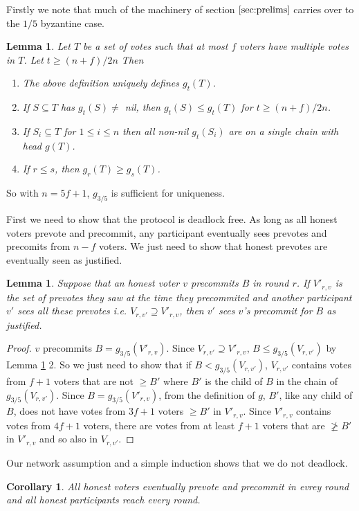 \documentclass{article}
\newtheorem{lemma}[theorem]{Lemma}
\newtheorem{corollary}[theorem]{Corollary}
\begin{document}
Firstly we note that much of the machinery of section $\ref{sec:prelims}$ carries over to the $1/5$ byzantine case.

\begin{lemma} \label{lem:ghost-monotonicity-general}
Let $T$ be a set of votes such that at most $f$ voters have multiple votes in $T$. Let $t \geq (n+f)/2n$ Then
\begin{enumerate}
\item The above definition uniquely defines $g_t(T)$.
\item If $S \subseteq T$ has $g_t(S) \neq$ nil, then $g_t(S) \leq g_t(T)$ for $t \geq (n+f)/2n$.
\item If $S_i \subseteq T$ for $1 \leq i \leq n$ then all non-nil $g_t(S_i)$ are on a single chain with head $g(T)$.
\item If $r \leq s$, then $g_r(T) \geq g_s(T)$.
\end{enumerate}
\end{lemma}
So with $n=5f+1$, $g_{3/5}$ is sufficient for uniqueness.

First we need to show that the protocol is deadlock free.
As long as all honest voters prevote and precommit, any participant eventually sees prevotes and precomits from $n-f$ voters. We just need to show that honest prevotes are eventually seen as justified.
\begin{lemma} Suppose that an honest voter $v$ precommits $B$ in round $r$. If $V'_{r,v}$ is the set of prevotes they saw at the time they precommited and another participant $v'$ sees all these prevotes i.e. $V_{r,v'} \supseteq V'_{r,v}$, then $v'$ sees $v$'s precommit for $B$ as justified. \end{lemma}
\begin{proof} $v$ precommits $B = g_{3/5}(V'_{r,v})$. Since $V_{r,v'} \supseteq V'_{r,v}$, $B \leq g_{3/5}(V_{r,v'})$ by Lemma \ref{lem:ghost-monotonicity-general} 2.
So we just need to show that if  $B < g_{3/5}(V_{r,v'})$, $V_{r,v'}$ contains votes from $f+1$ voters that are not $\geq B'$ where $B'$ is the child of $B$ in the chain of $g_{3/5}(V_{r,v'})$.
Since $B = g_{3/5}(V'_{r,v})$, from the definition of $g$, $B'$, like any child of $B$, does not have votes from $3f+1$ voters $\geq B'$ in $V'_{r,v}$.
Since $V'_{r,v}$ contains votes from $4f+1$ voters, there are votes from at least $f+1$ voters that are $\not \geq B'$ in $V'_{r,v}$ and so also in $V_{r,v'}$.
\end{proof}

Our network assumption and a simple induction shows that we do not deadlock.
\begin{corollary} All honest voters eventually prevote and precommit in evrey round and all honest participants reach every round.\end{corollary}
\end{document}
